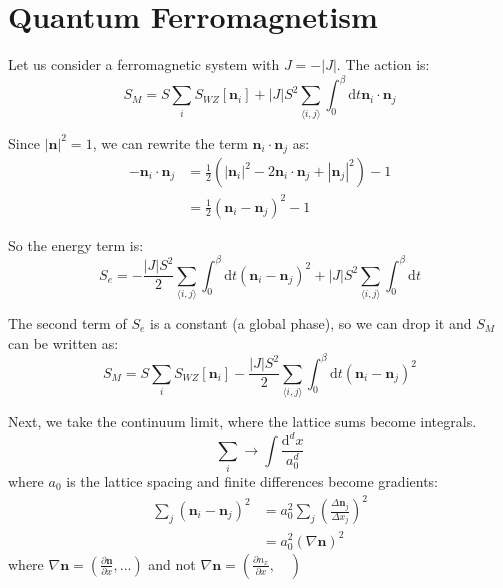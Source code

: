 \section{Quantum Ferromagnetism}

Let us consider a ferromagnetic system with $J = -|J|$. The action is:
\begin{equation}
S_M = S \sum_i S_{WZ} [\bm{n}_i] + |J|S^2 \sum_{\langle i,j \rangle} \int_0^\beta \mathrm{d}t \bm{n}_i \cdot \bm{n}_j
\end{equation}

Since $|\bm{n}|^2 = 1$, we can rewrite the term $\bm{n}_i \cdot \bm{n}_j$ as:
\begin{equation}
\begin{aligned}
-\bm{n}_i \cdot \bm{n}_j &= \frac{1}{2} (|\bm{n}_i|^2 -2 \bm{n}_i \cdot \bm{n}_j + |\bm{n}_j|^2) - 1 \\
&= \frac{1}{2} (\bm{n}_i - \bm{n}_j)^2 - 1
\end{aligned}
\end{equation}

So the energy term is:
\begin{equation}
S_e = - \frac{|J|S^2}{2} \sum_{\langle i,j \rangle} \int_0^\beta \mathrm{d}t (\bm{n}_i - \bm{n}_j)^2 + |J|S^2 \sum_{\langle i,j \rangle} \int_0^\beta \mathrm{d}t
\end{equation}

The second term of $S_e$ is a constant (a global phase), so we can drop it and $S_M$ can be written as:
\begin{equation}
S_M = S \sum_i S_{WZ} [\bm{n}_i] - \frac{|J|S^2}{2} \sum_{\langle i,j \rangle} \int_0^\beta \mathrm{d}t (\bm{n}_i - \bm{n}_j)^2
\end{equation}

Next, we take the continuum limit, where the lattice sums become integrals.
\begin{equation}
\sum_i \to \int \frac{\mathrm{d}^d x}{a_0^d}
\end{equation}
where $a_0$ is the lattice spacing and finite differences become gradients:
\begin{equation}
\begin{aligned}
\sum_j (\bm{n}_i - \bm{n}_j)^2 &= a_0^2 \sum_j (\frac{\Delta \bm{n}_j}{\Delta x_j})^2 \\
&= a_0^2 (\nabla \bm{n})^2
\end{aligned}
\end{equation}
where $\nabla \bm{n} = (\frac{\partial \bm{n}}{\partial x}, \dots)$ and not $\nabla \bm{n} = (\frac{\partial n_x}{\partial x}, \quad )$

